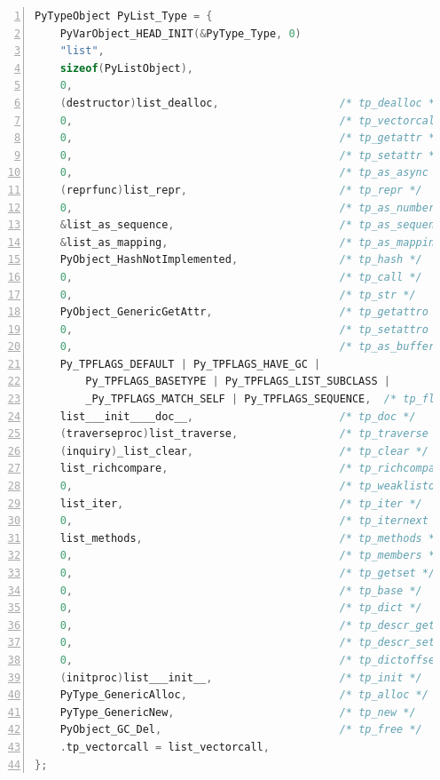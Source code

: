 \begin{lstlisting}[language=C, numbers=left, numbersep=1em, numberstyle=\footnotesize , breaklines=true]
PyTypeObject PyList_Type = {
    PyVarObject_HEAD_INIT(&PyType_Type, 0)
    "list",
    sizeof(PyListObject),
    0,
    (destructor)list_dealloc,                   /* tp_dealloc */
    0,                                          /* tp_vectorcall_offset */
    0,                                          /* tp_getattr */
    0,                                          /* tp_setattr */
    0,                                          /* tp_as_async */
    (reprfunc)list_repr,                        /* tp_repr */
    0,                                          /* tp_as_number */
    &list_as_sequence,                          /* tp_as_sequence */
    &list_as_mapping,                           /* tp_as_mapping */
    PyObject_HashNotImplemented,                /* tp_hash */
    0,                                          /* tp_call */
    0,                                          /* tp_str */
    PyObject_GenericGetAttr,                    /* tp_getattro */
    0,                                          /* tp_setattro */
    0,                                          /* tp_as_buffer */
    Py_TPFLAGS_DEFAULT | Py_TPFLAGS_HAVE_GC |
        Py_TPFLAGS_BASETYPE | Py_TPFLAGS_LIST_SUBCLASS |
        _Py_TPFLAGS_MATCH_SELF | Py_TPFLAGS_SEQUENCE,  /* tp_flags */
    list___init____doc__,                       /* tp_doc */
    (traverseproc)list_traverse,                /* tp_traverse */
    (inquiry)_list_clear,                       /* tp_clear */
    list_richcompare,                           /* tp_richcompare */
    0,                                          /* tp_weaklistoffset */
    list_iter,                                  /* tp_iter */
    0,                                          /* tp_iternext */
    list_methods,                               /* tp_methods */
    0,                                          /* tp_members */
    0,                                          /* tp_getset */
    0,                                          /* tp_base */
    0,                                          /* tp_dict */
    0,                                          /* tp_descr_get */
    0,                                          /* tp_descr_set */
    0,                                          /* tp_dictoffset */
    (initproc)list___init__,                    /* tp_init */
    PyType_GenericAlloc,                        /* tp_alloc */
    PyType_GenericNew,                          /* tp_new */
    PyObject_GC_Del,                            /* tp_free */
    .tp_vectorcall = list_vectorcall,
};
\end{lstlisting}

